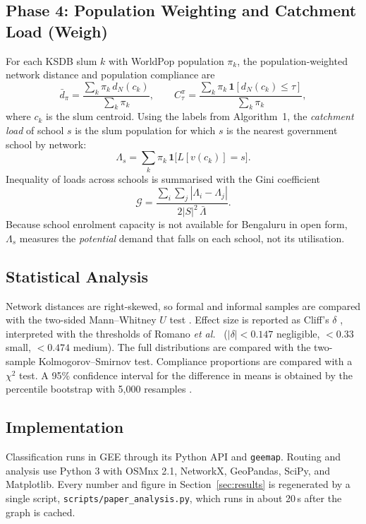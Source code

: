 \documentclass[conference]{IEEEtran}
\begin{document}
\subsection{Phase 4: Population Weighting and Catchment Load (Weigh)}
For each KSDB slum $k$ with WorldPop population $\pi_k$, the population-weighted network distance and population compliance are
\begin{equation}
\bar d_\pi=\frac{\sum_k \pi_k\, d_N(c_k)}{\sum_k \pi_k},\qquad
C^\pi_\tau=\frac{\sum_k \pi_k\,\mathbf{1}[d_N(c_k)\le\tau]}{\sum_k \pi_k},
\end{equation}
where $c_k$ is the slum centroid. Using the labels from Algorithm~1, the \emph{catchment load} of school $s$ is the slum population for which $s$ is the nearest government school by network:
\begin{equation}
\Lambda_s=\sum_k \pi_k\,\mathbf{1}\big[L[v(c_k)]=s\big].
\end{equation}
Inequality of loads across schools is summarised with the Gini coefficient
\begin{equation}
\mathcal{G}=\frac{\sum_{i}\sum_{j}|\Lambda_i-\Lambda_j|}{2|S|^2\,\bar\Lambda}.
\end{equation}
Because school enrolment capacity is not available for Bengaluru in open form, $\Lambda_s$ measures the \emph{potential} demand that falls on each school, not its utilisation.

\subsection{Statistical Analysis}
Network distances are right-skewed, so formal and informal samples are compared with the two-sided Mann--Whitney $U$ test \cite{mann1947}. Effect size is reported as Cliff's $\delta$ \cite{cliff1993}, interpreted with the thresholds of Romano \textit{et al.}\ \cite{romano2006} ($|\delta|<0.147$ negligible, $<0.33$ small, $<0.474$ medium). The full distributions are compared with the two-sample Kolmogorov--Smirnov test. Compliance proportions are compared with a $\chi^2$ test. A 95\% confidence interval for the difference in means is obtained by the percentile bootstrap with 5,000 resamples \cite{efron1993}.

\subsection{Implementation}
Classification runs in GEE through its Python API and \texttt{geemap}. Routing and analysis use Python 3 with OSMnx 2.1, NetworkX, GeoPandas, SciPy, and Matplotlib. Every number and figure in Section~\ref{sec:results} is regenerated by a single script, \texttt{scripts/paper\_analysis.py}, which runs in about 20\,s after the graph is cached.
\end{document}
